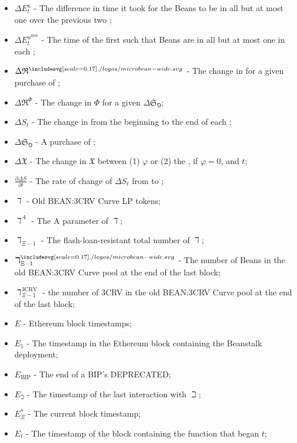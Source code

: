 \documentclass[class=article, crop=false]{standalone}
\begin{document}
\begin{itemize}[topsep=0pt, itemsep=3pt,leftmargin=16pt]
    \item[] $\Delta E_{t}^{u}$ - The difference in time it took for the Beans to be  in all but at most one  over the previous two ;
    \item[] $\Delta E_{t}^{u^{\text{first}}}$ - The time of the first  such that Beans are  in all but at most one  in each ;
    \item[] $\Delta \mathfrak{R}^{\bean}$ - The change in  \Bean for a given purchase of ;
    \item[] $\Delta \mathfrak{R}^{\Phi}$ - The change in  $\Phi$ for a given $\Delta \mathfrak{S}_{\Game}$;
    \item[] $\Delta S_t$ - The change in  from the beginning to the end of each ;
    \item[] $\Delta \mathfrak{S}_{\Game}$ - A purchase of ;
    \item[] $\Delta \mathfrak{X}$ - The change in $\mathfrak{X}$ between (1) $\varphi$ or (2) the , if $\varphi = 0$, and $t$;
    \item[] $\frac{\partial \Delta S}{\partial t}$ - The rate of change of $\Delta S_t$ from  to ;
    \item[] $\daleth$ - Old BEAN:3CRV Curve LP tokens;
    \item[] $\daleth^{A}$ - The A parameter of $\daleth$;
    \item[] $\daleth_{\Xi-1}$ - The flash-loan-resistant total number of $\daleth$;
    \item[] $\daleth_{\Xi-1}^{\bean}$ - The number of Beans in the old BEAN:3CRV Curve pool at the end of the last block;
    \item[] $\daleth_{\Xi-1}^{\text{3CRV}}$ - the number of 3CRV in the old BEAN:3CRV Curve pool at the end of the last block;
    \item[] $E$ - Ethereum block timestamps;
    \item[] $E_1$ - The timestamp in the Ethereum block containing the Beanstalk deployment;
    \item[] $E_{\text{BIP}}$ - The end of a BIP's  DEPRECATED;
    \item[] $E_{\beth}$ - The timestamp of the last interaction with $\beth$;
    \item[] $E_{\Xi}^*$ - The current block timestamp;
    \item[] $E_t$ - The timestamp of the block containing the  function that began $t$;

\end{itemize}
\end{document}
